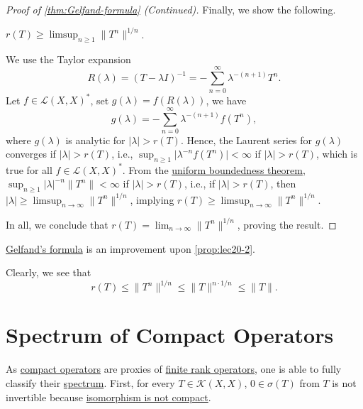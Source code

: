 \begin{proof}[Proof of \autoref{thm:Gelfand-formula} (Continued)]
	Finally, we show the following.
	\begin{claim}
		\(r(T) \geq \limsup_{n \geq 1} \lVert T^n \rVert ^{1 / n} \).
	\end{claim}
	\begin{explanation}
		We use the Taylor expansion
		\[
			R(\lambda ) = (T - \lambda I)^{-1} = - \sum_{n=0}^{\infty} \lambda ^{-(n+1)}T^n.
		\]
		Let \(f\in \mathcal{L} (X, X)^{\ast} \), set \(g(\lambda ) = f(R(\lambda ))\), we have
		\[
			g(\lambda ) = - \sum_{n=0}^{\infty} \lambda ^{-(n+1)} f(T^n),
		\]
		where \(g(\lambda )\) is analytic for \(\vert \lambda  \vert > r(T)\). Hence, the Laurent series for \(g(\lambda )\) converges if \(\vert \lambda  \vert > r(T)\), i.e., \(\sup _{n\geq 1} \vert \lambda ^{-n} f(T^n) \vert < \infty\) if \(\vert \lambda  \vert > r(T)\), which is true for all \(f\in \mathcal{L} (X, X)^{\ast} \). From the \hyperref[thm:uniform-boundedness]{uniform boundedness theorem}, \(\sup _{n\geq 1} \vert \lambda  \vert^{-n} \lVert T^n \rVert < \infty\) if \(\vert \lambda  \vert > r(T) \), i.e., if \(\vert \lambda  \vert > r(T) \), then \(\vert \lambda \vert \geq \limsup_{n \to \infty} \lVert T^n \rVert ^{1 / n}\), implying \(r(T) \geq \limsup_{n \to \infty} \lVert T^n \rVert ^{1 / n}\).
	\end{explanation}

	In all, we conclude that \(r(T) = \lim_{n \to \infty} \lVert T^n \rVert ^{1 / n}\), proving the result.
\end{proof}

\begin{note}
	\hyperref[thm:Gelfand-formula]{Gelfand's formula} is an improvement upon \autoref{prop:lec20-2}.
\end{note}
\begin{explanation}
	Clearly, we see that
	\[
		r(T) \leq \lVert T^n \rVert ^{1 / n} \leq \lVert T \rVert ^{n\cdot 1 / n} \leq \lVert T \rVert.
	\]
\end{explanation}

\section{Spectrum of Compact Operators}
As \hyperref[def:compact-op]{compact operators} are proxies of \hyperref[rmk:finite-rank-op]{finite rank operators}, one is able to fully classify their \hyperref[def:spectrum-point]{spectrum}. First, for every \(T\in \mathcal{K} (X, X)\), \(0\in \sigma (T)\) from \(T\) is not invertible because \hyperref[col:iso-are-not-compact]{isomorphism is not compact}.

